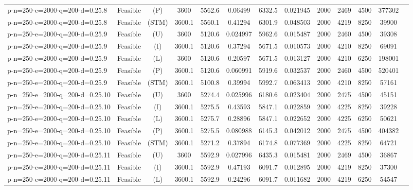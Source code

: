 \documentclass[landscape, a4paper]{article}
\newcommand{\STM}{\ensuremath{\mathrm{STM}}}
\newcommand{\Improved}{\ensuremath{\mathrm{I}}}
\newcommand{\Loose}{\ensuremath{\mathrm{L}}}
\newcommand{\Profit}{\ensuremath{\mathrm{P}}}
\newcommand{\Utility}{\ensuremath{\mathrm{U}}}
\begin{document}
\begin{center}
\begin{tabular}{lcccccccccccc}
p-n=250-e=2000-q=200-d=0.25.8 & Feasible & (\Profit) & 3600 & 5562.6 & 0.06499 & 6332.5 & 0.021945 & 2000 & 2469 & 4500 & 377302 & \\
p-n=250-e=2000-q=200-d=0.25.8 & Feasible & (\STM) & 3600.1 & 5560.1 & 0.41294 & 6301.9 & 0.048503 & 2000 & 4219 & 8250 & 39900 & \\
p-n=250-e=2000-q=200-d=0.25.9 & Feasible & (\Utility) & 3600 & 5120.6 & 0.024997 & 5962.6 & 0.015487 & 2000 & 2460 & 4500 & 39308 & \\
p-n=250-e=2000-q=200-d=0.25.9 & Feasible & (\Improved) & 3600.1 & 5120.6 & 0.37294 & 5671.5 & 0.010573 & 2000 & 4210 & 8250 & 69091 & \\
p-n=250-e=2000-q=200-d=0.25.9 & Feasible & (\Loose) & 3600 & 5120.6 & 0.20597 & 5671.5 & 0.013127 & 2000 & 4210 & 6250 & 198001 & \\
p-n=250-e=2000-q=200-d=0.25.9 & Feasible & (\Profit) & 3600.1 & 5120.6 & 0.060991 & 5919.6 & 0.032537 & 2000 & 2460 & 4500 & 520401 & \\
p-n=250-e=2000-q=200-d=0.25.9 & Feasible & (\STM) & 3600.1 & 5100.8 & 0.39994 & 5992.7 & 0.063413 & 2000 & 4210 & 8250 & 57161 & \\
p-n=250-e=2000-q=200-d=0.25.10 & Feasible & (\Utility) & 3600 & 5274.4 & 0.025996 & 6180.6 & 0.023404 & 2000 & 2475 & 4500 & 45151 & \\
p-n=250-e=2000-q=200-d=0.25.10 & Feasible & (\Improved) & 3600.1 & 5275.5 & 0.43593 & 5847.1 & 0.022859 & 2000 & 4225 & 8250 & 39228 & \\
p-n=250-e=2000-q=200-d=0.25.10 & Feasible & (\Loose) & 3600.1 & 5275.7 & 0.28896 & 5847.1 & 0.022652 & 2000 & 4225 & 6250 & 50621 & \\
p-n=250-e=2000-q=200-d=0.25.10 & Feasible & (\Profit) & 3600.1 & 5275.5 & 0.080988 & 6145.3 & 0.042012 & 2000 & 2475 & 4500 & 404382 & \\
p-n=250-e=2000-q=200-d=0.25.10 & Feasible & (\STM) & 3600.1 & 5271.2 & 0.37894 & 6174.8 & 0.077369 & 2000 & 4225 & 8250 & 64721 & \\
p-n=250-e=2000-q=200-d=0.25.11 & Feasible & (\Utility) & 3600 & 5592.9 & 0.027996 & 6435.3 & 0.015481 & 2000 & 2469 & 4500 & 36867 & \\
p-n=250-e=2000-q=200-d=0.25.11 & Feasible & (\Improved) & 3600.1 & 5592.9 & 0.47193 & 6091.7 & 0.012895 & 2000 & 4219 & 8250 & 37300 & \\
p-n=250-e=2000-q=200-d=0.25.11 & Feasible & (\Loose) & 3600.1 & 5592.9 & 0.24296 & 6091.7 & 0.011682 & 2000 & 4219 & 6250 & 54547 & \\

\end{tabular}
\end{center}
\end{document}
